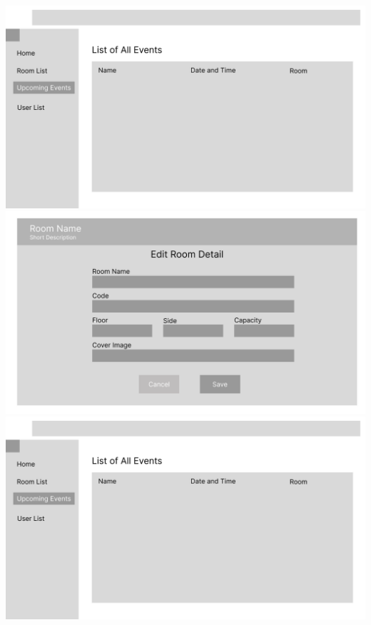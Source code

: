 \documentclass[12pt,titlepage,a4paper]{report}
\begin{document}
\begin{center}
        \includegraphics[width=\textwidth]{images/figures/UIUX/Event_List_Page_(Atmin).png}\\
        \includegraphics[width=\textwidth]{images/figures/UIUX/Edit_Room_(Atmin).png}\\
        \includegraphics[width=\textwidth]{images/figures/UIUX/Event_List_Page_(Atmin).png}\\

\end{center}
\end{document}

